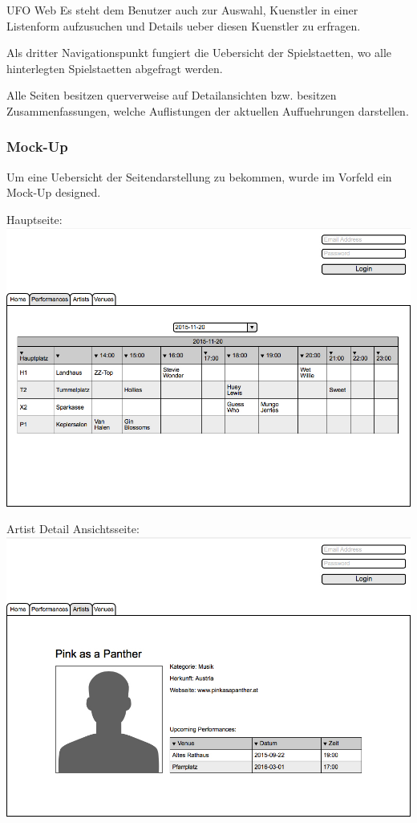 \begin{section}{UFO Web}
Es steht dem Benutzer auch zur Auswahl, Kuenstler in einer Listenform aufzusuchen und Details ueber diesen Kuenstler zu erfragen.

Als dritter Navigationspunkt fungiert die Uebersicht der Spielstaetten, wo alle hinterlegten Spielstaetten abgefragt werden. 

Alle Seiten besitzen querverweise auf Detailansichten bzw. besitzen Zusammenfassungen, welche Auflistungen der aktuellen Auffuehrungen darstellen. 

\subsubsection{Mock-Up}

Um eine Uebersicht der Seitendarstellung zu bekommen, wurde im Vorfeld ein Mock-Up designed.

Hauptseite: \\
\includegraphics[angle=0, scale=0.35]{./img/performanceview.jpg}
\FloatBarrier

Artist Detail Ansichtsseite: \\
\includegraphics[angle=0, scale=0.35]{./img/artistdetailview.jpg}
\FloatBarrier



\end{section}
